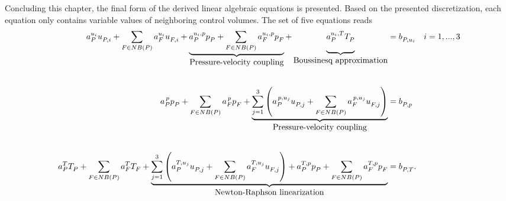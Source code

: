 Concluding this chapter, the final form of the derived linear algebraic equations is presented. Based on the presented discretization, each equation only contains variable values of neighboring control volumes. The set of five equations reads
\begin{align*}
  a_P^{u_i} u_{P,i}^{\vphantom{u_i}}
  + \sum_{F \in NB(P)} a_F^{u_i} u_{F,i}^{\vphantom{u_i}} 
  + \underbrace{\vphantom{\sum_F}{a_P^{u_i,p} p_P^{\vphantom{u_i,p}}
  + \sum_{F \in NB(P)} a_F^{u_i,p} p_F^{\vphantom{u_i,p}}}}_{\hbox{Pressure-velocity coupling}} 
  + \underbrace{\vphantom{\sum_F}{ a_P^{u_i,T} T_P^{\vphantom{u_i,T}}}}_{\hbox{Boussinesq approximation}} 
  &= b_{P,u_i}^{\vphantom{u_i,T}} \quad i=1,...,3  \\[2.0em]
  a_P^{\, p} p_{P}^{\vphantom{p}} 
  + \sum_{F \in NB(P)} a_F^{\,p} p_F^{\vphantom{\,p}} 
  + \underbrace{ \sum_{j=1}^3 \left(a_P^{\,p,u_j} u_{P,j}^{\vphantom{p,u_j}}
  + \sum_{F \in NB(P)} a_F^{\, p,u_j} u_{F,j}^{\vphantom{p,u_j}} \right)}_{\hbox{Pressure-velocity coupling}} 
  &= b_{P,p}^{\vphantom{p,u_j}}  \\[2.0em]
  a_P^{T} T_{P}^{\vphantom{T}} 
  + \sum_{F \in NB(P)} a_F^{T} T_F^{\vphantom{T}} 
  + \underbrace{\sum_{j=1}^3 \left(a_P^{T,u_j} u_{P,j}^{\vphantom{T,u_j}}
  + \sum_{F \in NB(P)} a_F^{T,u_j} u_{F,j}^{\vphantom{T,u_j}} \right) 
  + a_P^{T,p} p_P^{\vphantom{T,p}} 
+ \sum_{F \in NB(P) } a_F^{T,p} p_F^{\vphantom{T,p}}}_{\hbox{Newton-Raphson linearization}} 
  &= b_{P,T}^{\vphantom{T,p}}.
\end{align*}

